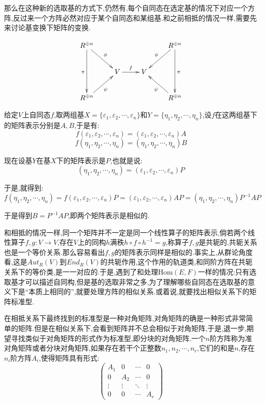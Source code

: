那么在这种新的选取基的方式下,仍然有,每个自同态在选定基的情况下对应一个方阵,反过来一个方阵必然对应于某个自同态和某组基.和之前相抵的情况一样,需要先来讨论基变换下矩阵的变换.

$$\xymatrix{
	R^{\oplus n}\ar[dr]^{\phi}\ar[dd]_{\pi}&&&R^{\oplus n}\ar[dl]_{\phi}\ar[dd]^{\pi}\\
	&V\ar[r]^{f}&V&\\
	R^{\oplus n}\ar[ur]_{\psi}&&&R^{\oplus n}\ar[ul]^{\psi}
}$$

给定$V$上自同态$f$,取两组基$X=\{\varepsilon_1,\varepsilon_2,\cdots,\varepsilon_n\}$和$Y=\{\eta_1,\eta_2,\cdots,\eta_n\}$,设$f$在这两组基下的矩阵表示分别是$A,B$,于是有:
$$f(\varepsilon_1,\varepsilon_2,\cdots,\varepsilon_n)=(\varepsilon_1,\varepsilon_2,\cdots,\varepsilon_n)A$$
$$f(\eta_1,\eta_2,\cdots,\eta_n)=(\eta_1,\eta_2,\cdots,\eta_n)B$$


现在设基$Y$在基$X$下的矩阵表示是$P$,也就是说:
$$(\eta_1,\eta_2,\cdots,\eta_n)=(\varepsilon_1,\varepsilon_2,\cdots,\varepsilon_n)P$$

于是,就得到:
$$f(\eta_1,\eta_2,\cdots,\eta_n)=f(\varepsilon_1,\varepsilon_2,\cdots,\varepsilon_n)P
=(\varepsilon_1,\varepsilon_2,\cdots,\varepsilon_n)AP=(\eta_1,\eta_2,\cdots,\eta_n)P^{-1}AP$$

于是得到$B=P^{-1}AP$,即两个矩阵表示是相似的.

和相抵的情况一样,同一个矩阵并不一定是同一个线性算子的矩阵表示,倘若两个线性算子$f,g:V\to V$,存在$V$上的同构$h$满秩$h\circ f\circ h^{-1}=g$,称算子$f,g$是共轭的,共轭关系也是一个等价关系.那么容易看出$f,g$的矩阵表示同样是相似的.事实上,从群论角度看,这是$Aut_R(V)$到$End_R(V)$的共轭作用,这个作用的轨道类,和同阶方阵在共轭关系下的等价类,是一一对应的.于是,遇到了和处理$\mathrm{Hom}(E,F)$一样的情况:只有选取基才可以描述自同构,但是基的选取非常之多,为了理解哪些自同态在选取基的意义下是“本质上相同的”,就要处理方阵的相似关系.或着说,就要找出相似关系下的矩阵标准型.

在相抵关系下最终找到的标准型是一种对角矩阵,对角矩阵的确是一种形式非常简单的矩阵.但是在相似关系下,会看到矩阵并不总会相似于对角矩阵,于是,退一步,期望寻找类似于对角矩阵的形式作为标准型,即分块的对角矩阵.一个$n$阶方阵称为准对角矩阵或者分块对角矩阵,如果存在若干个正整数$n_1,n_2,\cdots,n_r$,它们的和是$n$,存在$n_i$阶方阵$A_i$,使得矩阵具有形式:
$$\left(\begin{array}{cccc}
A_1&0&\cdots&0\\
0&A_2&\cdots&0\\
\vdots&\vdots&\ddots&\vdots\\
0&0&\cdots&A_r\end{array}\right)$$

